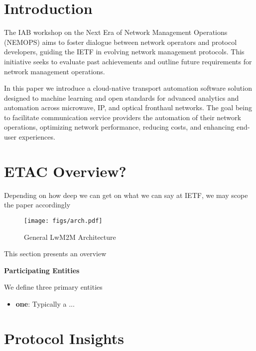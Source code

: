 \documentclass[11pt,sigconf]{iabart}
\begin{document}

\maketitle

\section{Introduction} \label{introduction}

The IAB workshop on the Next Era of Network Management Operations (NEMOPS) aims to foster dialogue between network operators and protocol developers, guiding the IETF in evolving network management protocols. This initiative seeks to evaluate past achievements and outline future requirements for network management operations.

In this paper we introduce a cloud-native transport automation software solution designed to machine learning and open standards for advanced analytics and automation across microwave, IP, and optical fronthaul networks. The goal being to facilitate communication service providers the automation of their network operations, optimizing network performance, reducing costs, and enhancing end-user experiences.


\section{ETAC Overview?} \label{overview}

Depending on how deep we can get on what we can say at IETF, we may scope the paper accordingly

\begin{figure}[h]
  \centering
  \texttt{[image: figs/arch.pdf]}
  \caption{General LwM2M Architecture}
  \label{fig:overall_architecture}
\end{figure}


This section presents an overview

\textbf{Participating Entities}

We define three primary entities

\begin{itemize}
  \item \textbf{one}: Typically a ...
\end{itemize}


\section{Protocol Insights} \label{insights}
\end{document}
